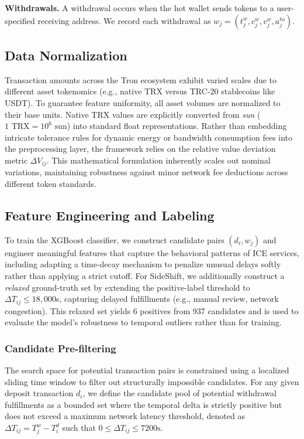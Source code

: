 \documentclass[journal]{IEEEtran}
\begin{document}
    \textbf{Withdrawals.} A withdrawal occurs when the hot wallet sends tokens to a user-specified receiving address. We record each withdrawal as $w_j=(t_j^w, c_j^w, v_j^w, a_j^{\text{to}})$.
    
    \subsection{Data Normalization}
    Transaction amounts across the Tron ecosystem exhibit varied scales due to different asset tokenomics (e.g., native TRX versus TRC-20 stablecoins like USDT). To guarantee feature uniformity, all asset volumes are normalized to their base units. Native TRX values are explicitly converted from \textit{sun} ($1\text{ TRX} = 10^6\text{ sun}$) into standard float representations. Rather than embedding intricate tolerance rules for dynamic energy or bandwidth consumption fees into the preprocessing layer, the framework relies on the relative value deviation metric $\Delta V_{ij}$. This mathematical formulation inherently scales out nominal variations, maintaining robustness against minor network fee deductions across different token standards.
    
    \subsection{Feature Engineering and Labeling}
    
    To train the XGBoost classifier, we construct candidate pairs $(d_i, w_j)$ and engineer meaningful features that capture the behavioral patterns of ICE services, including adapting a time-decay mechanism to penalize unusual delays softly rather than applying a strict cutoff. For SideShift, we additionally construct a \emph{relaxed} ground-truth set
    by extending the positive-label threshold to $\Delta T_{ij} \leq 18{,}000$s,
    capturing delayed fulfillments (e.g., manual review, network congestion).
    This relaxed set yields 6 positives from 937 candidates and is used to
    evaluate the model's robustness to temporal outliers rather than for training.
    
    \subsubsection{Candidate Pre-filtering}
    The search space for potential transaction pairs is constrained using a localized sliding time window to filter out structurally impossible candidates. For any given deposit transaction $d_i$, we define the candidate pool of potential withdrawal fulfillments as a bounded set where the temporal delta is strictly positive but does not exceed a maximum network latency threshold, denoted as $\Delta T_{ij} = T_{j}^{w} - T_{i}^{d}$ such that $0 \le \Delta T_{ij} \le 7200\text{s}$.
    
\end{document}
